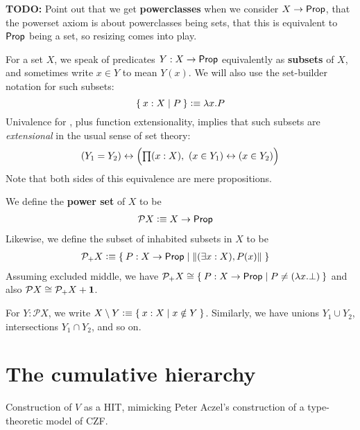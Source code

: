 \textbf{TODO:} Point out that we get \textbf{powerclasses} when we consider $X \to \mathsf{Prop}$, that the
powerset axiom is about powerclasses being sets, that this is equivalent to $\mathsf{Prop}$ being
a set, so resizing comes into play.

For a set $X$, we speak of predicates $Y:X\to \mathsf{Prop}$ equivalently as \textbf{subsets} of $X$, and sometimes write $x\in Y$ to mean $Y(x)$.
We will also use the set-builder notation for such subsets:
\[ \Set{x:X | P } \vcentcolon\equiv \lambda x.P \]
Univalence for \prop, plus function extensionality, implies that such subsets are \emph{extensional} in the usual sense of set theory:
\[ (Y_1 = Y_2) \leftrightarrow \Big(\prd{x:X} (x\in Y_1) \leftrightarrow (x\in Y_2)\Big) \]
Note that both sides of this equivalence are mere propositions.

We define the \textbf{power set} of $X$ to be
\begin{align*}
  \mathcal{P} X &\vcentcolon\equiv X\to \mathsf{Prop}
\end{align*}
Likewise, we define the subset of inhabited subsets in $X$ to be
\begin{align*}
  \mathcal{P}_+ X &\defeq \setof{P:X\to \prop | \brck{(\exists x:X), P(x)}}
\end{align*}
Assuming excluded middle, we have $\mathcal{P}_+ X \cong \setof{P:X\to \prop | P \neq (\lambda x.\bot)}$ and also $\mathcal{P} X \cong \mathcal{P}_+ X + \mathbf{1}$.

For $Y:\mathcal{P}X$, we write $X\setminus Y \vcentcolon\equiv \Set{x:X | x\notin Y}$.
Similarly, we have unions $Y_1 \cup Y_2$, intersections $Y_1 \cap Y_2$, and so on.

\section{The cumulative hierarchy}
\label{sec:cumulative-hierarchy}

Construction of $V$ as a HIT, mimicking Peter Aczel's construction of a type-theoretic
model of CZF.




